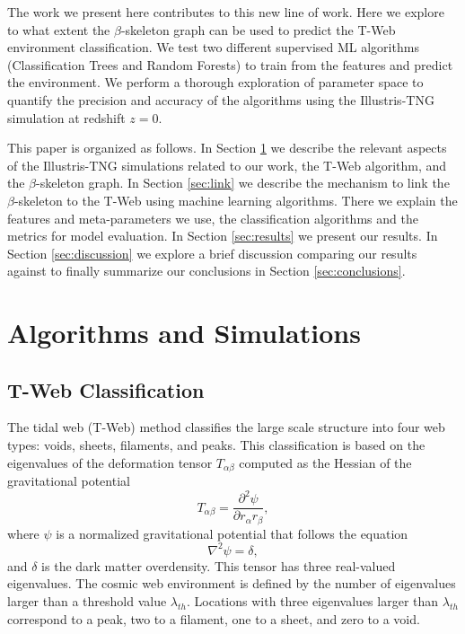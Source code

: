 \documentclass[usenatbib]{mnras}
\begin{document}
The work we present here contributes to this new line of work.
Here we explore to what extent the $\beta$-skeleton graph \citep{Fang2019} can be used to predict the T-Web \citep{Forero-Romero2009} environment classification.
We test two different supervised ML
algorithms (Classification Trees and Random Forests) 
to train from the features and predict the environment.
We perform a thorough exploration of parameter space to quantify the precision and accuracy of the algorithms using the Illustris-TNG simulation \citep{Nelson2019} at redshift $z=0$.

This paper is organized as follows. 
In Section \ref{sec:init} we describe the relevant aspects of the Illustris-TNG
simulations related to our work, the T-Web algorithm,
and the $\beta$-skeleton graph.
In Section \ref{sec:link} we describe the mechanism to link the
$\beta$-skeleton to the T-Web using machine learning algorithms.
There we explain the features and meta-parameters we use, the
classification algorithms and the metrics for model evaluation.  
In Section \ref{sec:results} we present our results. In Section \ref{sec:discussion} we explore a brief discussion comparing our results against \citep{Tsizh2019} to finally summarize our conclusions in Section \ref{sec:conclusions}.

\section{Algorithms and Simulations}\label{sec:init}

\subsection{T-Web Classification}


The tidal web (T-Web) method \citep{Hahn2007, Forero-Romero2009}
classifies the large scale structure into four web types: voids,
sheets, filaments, and peaks.   
This classification is based on the eigenvalues of the deformation
tensor $T_{\alpha\beta}$ computed as the Hessian of the gravitational potential 
\begin{equation}
T_{\alpha\beta}=\frac{\partial^2\psi}{\partial r_{\alpha}r_{\beta}},
\end{equation}
%
where $\psi$ is a normalized gravitational potential that follows the equation
\begin{equation}
    \nabla^2 \psi = \delta,
\end{equation}
%
and $\delta$ is the dark matter overdensity.
This tensor has three real-valued eigenvalues. 
The cosmic web environment is defined by the number of eigenvalues
larger than a threshold value $\lambda_{th}$.
Locations with three eigenvalues larger than $\lambda_{th}$ correspond
to a peak, two to a filament, one to a sheet, and zero to a void.
\end{document}
